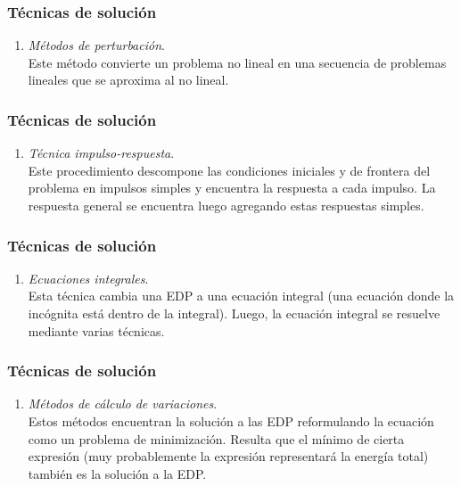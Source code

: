 \documentclass[12pt]{beamer}
\begin{document}
\begin{frame}
\frametitle{Técnicas de solución}
\begin{enumerate}
\conti
\item \emph{Métodos de perturbación}.
\\
\bigskip
Este método convierte un problema no lineal en una secuencia de problemas lineales que se aproxima al no lineal.
\seti
\end{enumerate}
\end{frame}
\begin{frame}
\frametitle{Técnicas de solución}
\begin{enumerate}
\conti
\item \emph{Técnica impulso-respuesta}.
\\
\bigskip
Este procedimiento descompone las condiciones iniciales y de frontera del problema en impulsos simples y encuentra la respuesta a cada impulso. La respuesta general se encuentra luego agregando estas respuestas simples.
\seti
\end{enumerate}
\end{frame}
\begin{frame}
\frametitle{Técnicas de solución}
\begin{enumerate}
\conti
\item \emph{Ecuaciones integrales}. 
\\
\bigskip
Esta técnica cambia una EDP a una ecuación integral (una ecuación donde la incógnita está dentro de la integral). Luego, la ecuación integral se resuelve mediante varias técnicas.
\seti
\end{enumerate}
\end{frame}
\begin{frame}
\frametitle{Técnicas de solución}
\begin{enumerate}
\conti
\item \emph{Métodos de cálculo de variaciones}.
\\
\bigskip
Estos métodos encuentran la solución a las EDP reformulando la ecuación como un problema de minimización. Resulta que el mínimo de cierta expresión (muy probablemente la expresión representará la energía total) también es la solución a la EDP.
\seti
\end{enumerate}
\end{frame}
\end{document}
